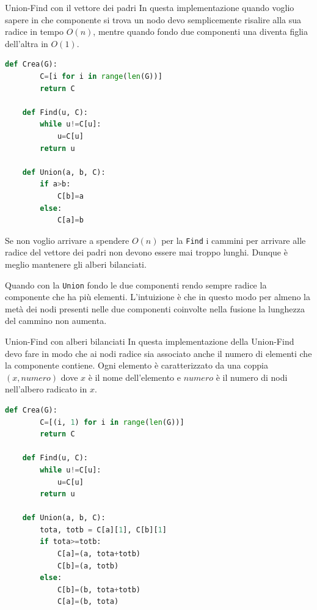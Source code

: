 \begin{Algoritmo}{Union-Find con il vettore dei padri}{}
    In questa implementazione quando voglio sapere in che componente si trova un nodo devo semplicemente risalire alla sua radice in tempo $O(n)$, mentre quando fondo due componenti una diventa figlia dell'altra in $O(1)$.

    \begin{lstlisting}[language=Python]
    def Crea(G):
        C=[i for i in range(len(G))]
        return C

    def Find(u, C):
        while u!=C[u]:
            u=C[u]
        return u

    def Union(a, b, C):
        if a>b:
            C[b]=a
        else:
            C[a]=b
    \end{lstlisting}
\end{Algoritmo}

Se non voglio arrivare a spendere $O(n)$ per la \verb|Find| i cammini per arrivare alle radice del vettore dei padri non devono essere mai troppo lunghi. Dunque è meglio mantenere gli alberi bilanciati.

Quando con la \verb|Union| fondo le due componenti rendo sempre radice la componente che ha più elementi. L'intuizione è che in questo modo per almeno la metà dei nodi presenti nelle due componenti  coinvolte nella fusione la lunghezza del cammino non aumenta. 

\begin{Algoritmo}{Union-Find con alberi bilanciati}{}
    In questa implementazione della Union-Find devo fare in modo che ai nodi radice sia associato anche il numero di elementi che la componente contiene. 
    Ogni elemento è caratterizzato da una coppia $(x, numero)$ dove $x$ è il nome dell’elemento e $numero$ è il numero di nodi nell’albero radicato in $x$.

    \begin{lstlisting}[language=Python]
    def Crea(G):
        C=[(i, 1) for i in range(len(G))]
        return C

    def Find(u, C):
        while u!=C[u]:
            u=C[u]
        return u

    def Union(a, b, C):
        tota, totb = C[a][1], C[b][1]
        if tota>=totb:
            C[a]=(a, tota+totb)
            C[b]=(a, totb)
        else:
            C[b]=(b, tota+totb)
            C[a]=(b, tota)
    \end{lstlisting}
\end{Algoritmo}

